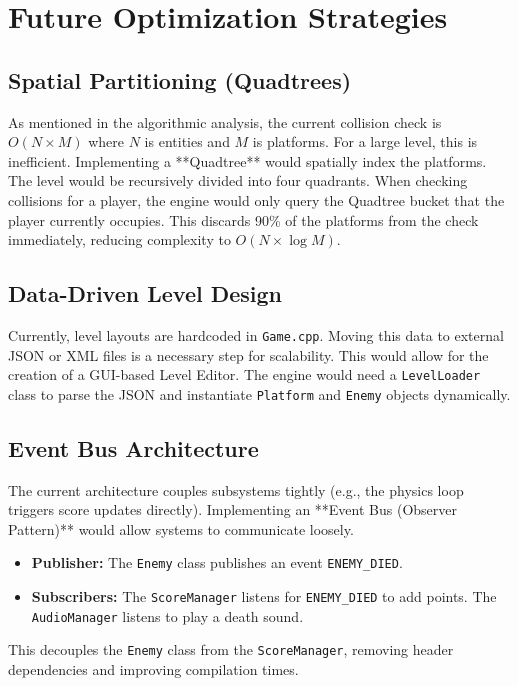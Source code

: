 \documentclass[10pt, a4paper]{article}
\begin{document}
\newpage

\section{Future Optimization Strategies}

\subsection{Spatial Partitioning (Quadtrees)}
As mentioned in the algorithmic analysis, the current collision check is $O(N \times M)$ where $N$ is entities and $M$ is platforms. For a large level, this is inefficient.
Implementing a **Quadtree** would spatially index the platforms. The level would be recursively divided into four quadrants. When checking collisions for a player, the engine would only query the Quadtree bucket that the player currently occupies. This discards 90\% of the platforms from the check immediately, reducing complexity to $O(N \times \log M)$.

\subsection{Data-Driven Level Design}
Currently, level layouts are hardcoded in \texttt{Game.cpp}. Moving this data to external JSON or XML files is a necessary step for scalability. This would allow for the creation of a GUI-based Level Editor. The engine would need a \texttt{LevelLoader} class to parse the JSON and instantiate \texttt{Platform} and \texttt{Enemy} objects dynamically.

\subsection{Event Bus Architecture}
The current architecture couples subsystems tightly (e.g., the physics loop triggers score updates directly). Implementing an **Event Bus (Observer Pattern)** would allow systems to communicate loosely.
\begin{itemize}
    \item \textbf{Publisher:} The \texttt{Enemy} class publishes an event \texttt{ENEMY\_DIED}.
    \item \textbf{Subscribers:} The \texttt{ScoreManager} listens for \texttt{ENEMY\_DIED} to add points. The \texttt{AudioManager} listens to play a death sound.
\end{itemize}
This decouples the \texttt{Enemy} class from the \texttt{ScoreManager}, removing header dependencies and improving compilation times.
\end{document}

